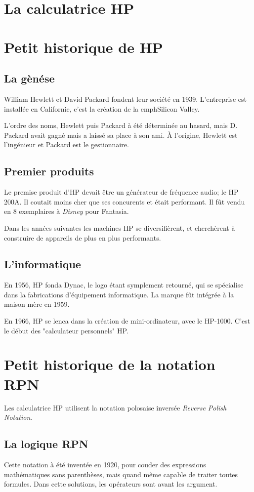 \documentclass[a4paper]{article}
\begin{document}
\section*{La calculatrice HP}
\section{Petit historique de HP}
\subsection{La gènése}
William Hewlett et David Packard fondent leur société en 1939. L'entreprise est installée en Californie, c'est la création de la emph{Silicon Valley}.

L'ordre des noms, Hewlett puis Packard à été déterminée au hasard, mais D. Packard avait gagné mais a laissé sa place à son ami. \`A l'origine, Hewlett est l'ingénieur et Packard est le gestionnaire.

\subsection{Premier produits}
Le premise produit d'HP devait être un générateur de fréquence audio; le HP 200A. Il coutait moins cher que ses concurents et était performant. Il fût vendu en 8 exemplaires à \emph{Disney} pour Fantasia.

Dans les années suivantes les machines HP se diversifièrent, et cherchèrent à construire de appareils de plus en plus performants.

\subsection{L'informatique}
En 1956, HP fonda Dynac, le logo étant symplement retourné, qui se spécialise dans la fabrications d'équipement informatique. La marque fût intégrée à la maison mère en 1959.

En 1966, HP se lenca dans la création de mini-ordinateur, avec le HP-1000. C'est le début des "calculateur personnels" HP. 
\section{Petit historique de la notation RPN}
Les calculatrice HP utilisent la notation polosaise inversée \emph{Reverse Polish Notation}.

\subsection{La logique RPN}
Cette notation à été inventée en 1920, pour couder des expressions mathématiques sans parenthèses, mais quand même capable de traiter toutes formules. Dans cette solutions, les opérateurs sont avant les argument.
\end{document}
